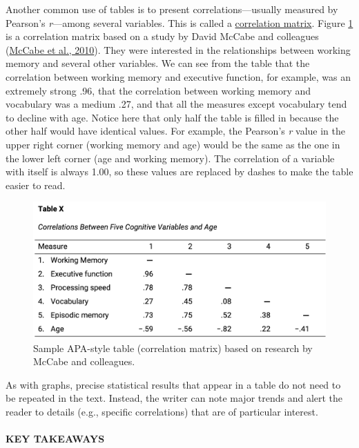 \documentclass[
]{krantz}
\begin{document}
Another common use of tables is to present correlations---usually measured by Pearson's \emph{r}---among several variables. This is called a \protect\hyperlink{correlation-matrix-1}{correlation matrix}. Figure \ref{fig:apamatrix} is a correlation matrix based on a study by David McCabe and colleagues (\protect\hyperlink{ref-mccabe2010relationship}{McCabe et al., 2010}). They were interested in the relationships between working memory and several other variables. We can see from the table that the correlation between working memory and executive function, for example, was an extremely strong .96, that the correlation between working memory and vocabulary was a medium .27, and that all the measures except vocabulary tend to decline with age. Notice here that only half the table is filled in because the other half would have identical values. For example, the Pearson's \emph{r} value in the upper right corner (working memory and age) would be the same as the one in the lower left corner (age and working memory). The correlation of a variable with itself is always 1.00, so these values are replaced by dashes to make the table easier to read.

\begin{figure}

{\centering \includegraphics[width=0.7\linewidth]{images/ch12/apamatrix} 

}

\caption{Sample APA-style table (correlation matrix) based on research by McCabe and colleagues.}\label{fig:apamatrix}
\end{figure}

As with graphs, precise statistical results that appear in a table do not need to be repeated in the text. Instead, the writer can note major trends and alert the reader to details (e.g., specific correlations) that are of particular interest.

\hypertarget{key-takeaways-36}{%
\paragraph*{KEY TAKEAWAYS}\label{key-takeaways-36}}
\end{document}
